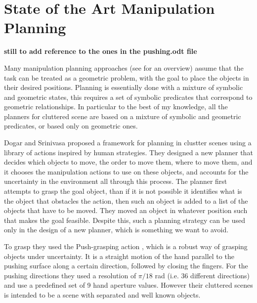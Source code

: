 \chapter{State of the Art Manipulation Planning}
\label{ch:state_of_the_art}
\textbf{still to add reference to the ones in the pushing.odt file}

Many manipulation planning approaches (see \citep{PlanningAlgorithms} for an overview) assume that the task can be treated as a geometric problem, with the goal to place the objects in their desired positions. Planning is essentially done with a mixture of symbolic and geometric states, this
requires a set of symbolic predicates that correspond to geometric
relationships. 
In particular to the best of my knowledge, all the planners for cluttered scene are based on a mixture of symbolic and geometric predicates, or based only on geometric ones. 

Dogar and Srinivasa \cite{Dogar2011} proposed a framework for planning in clustter scenes using a library of actions inspired by human strategies. They designed a new planner that decides which
objects to move, the order to move them, where to move them, and it chooses the manipulation actions
to use on these objects, and accounts for the uncertainty
in the environment all through this process. 
The planner first attempts to grasp the goal object, than if it is not possible it identifies what is the object that obstacles  the action, then such an object is added to a list of the objects that have to be moved. They moved an object in whatever position such that makes the goal feasible. Despite this, such a planning strategy can be used only in the design of a new planner, which is something we want to avoid.

To grasp they used the Push-grasping action \cite{Dogar_2010_6652} , which is a robust way of grasping objects
under uncertainty. It is a straight motion of the hand
parallel to the pushing surface along a certain direction,
followed by closing the fingers.
For the pushing directions they used a resolution of $\pi/18$ rad (i.e. 36
different directions) and  use a predefined set of 9 hand
aperture values.
However their cluttered scenes is intended to be a scene with separated and well known objects. 

